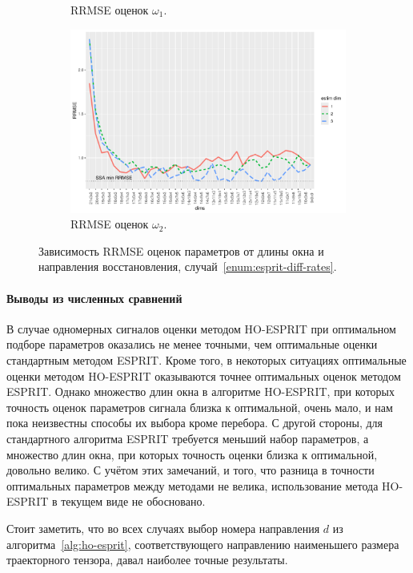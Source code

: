\documentclass[specialist,
  substylefile=spbu.rtx,
subf,href,colorlinks=true, 12pt]{disser}
\theoremstyle{plain}
\theoremstyle{definition}
\theoremstyle{remark}
\begin{document}
\begin{figure}[!ht]
\begin{subfigure}{0.49\linewidth}
    \caption{RRMSE оценок $\omega_1$.}
    \label{fig:freq1_dims}
  \end{subfigure}
  \begin{subfigure}{0.49\linewidth}
    \includegraphics[width=\linewidth]{freq2_dims.pdf}
    \caption{RRMSE оценок $\omega_2$.}
    \label{fig:freq2_dims}
  \end{subfigure}
  \caption{Зависимость RRMSE оценок параметров от длины окна и направления восстановления,
  случай~\ref{enum:esprit-diff-rates}.}
  \label{fig:dims_diff_rates}
\end{figure}

\paragraph{Выводы из численных сравнений}
В случае одномерных сигналов оценки методом HO-ESPRIT при оптимальном подборе параметров
оказались не менее точными, чем оптимальные оценки стандартным методом ESPRIT.
Кроме того, в некоторых ситуациях оптимальные оценки методом HO-ESPRIT оказываются точнее
оптимальных оценок методом ESPRIT.
Однако множество длин окна в алгоритме HO-ESPRIT, при которых точность оценок параметров сигнала
близка к оптимальной, очень мало, и нам пока неизвестны способы их выбора кроме перебора.
С другой стороны, для стандартного алгоритма ESPRIT требуется меньший набор параметров,
а множество длин окна, при которых точность оценки близка к оптимальной, довольно велико.
С учётом этих замечаний, и того, что разница в точности оптимальных
параметров между методами не велика, использование метода HO-ESPRIT в текущем виде
не обосновано.

Стоит заметить, что во всех случаях выбор номера направления $d$ из
алгоритма~\ref{alg:ho-esprit}, соответствующего направлению наименьшего размера
траекторного тензора, давал наиболее точные результаты.



\end{document}

